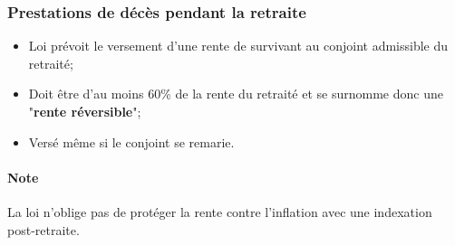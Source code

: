 \documentclass[10pt, french]{article}
\begin{document}
\begin{multicols*}{3}
\subsubsection*{Prestations de décès pendant la retraite}
\begin{itemize}[leftmargin = *]
	\item	Loi prévoit le versement d'une rente de survivant au conjoint admissible du retraité;
	\item	Doit être d'au moins 60\% de la rente du retraité et se surnomme donc une "\textbf{rente réversible}";
	\item	Versé même si le conjoint se remarie.
\end{itemize}

\paragraph{Note}	La loi n'oblige pas de protéger la rente contre l'inflation avec une indexation post-retraite.

\end{multicols*}
\end{document}
